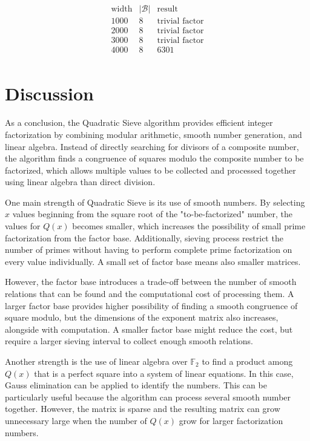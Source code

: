 \documentclass[11pt,a4paper]{article}
\begin{document}
\[
\begin{array}{c|c|c}
\text{width} & |\mathcal{B}| & \text{result} \\ \hline
1000 & 8 & \text{trivial factor} \\
2000 & 8 & \text{trivial factor} \\
3000 & 8 & \text{trivial factor} \\
4000 & 8 & 6301 \\
\end{array}
\]

\section*{Discussion}

As a conclusion, the Quadratic Sieve algorithm provides efficient integer factorization by combining modular arithmetic, smooth number generation, and linear algebra. Instead of directly searching for divisors of a composite number, the algorithm finds a congruence of squares modulo the composite number to be factorized, which allows multiple values to be collected and processed together using linear algebra than direct division.

One main strength of Quadratic Sieve is its use of smooth numbers. By selecting $x$ values beginning from the square root of the "to-be-factorized" number, the values for $Q(x)$ becomes smaller, which increases the possibility of small prime factorization from the factor base. Additionally, sieving process restrict the number of primes without having to perform complete prime factorization on every value individually. A small set of factor base means also smaller matrices.

However, the factor base introduces a trade-off between the number of smooth relations that can be found and the computational cost of processing them. A larger factor base provides higher possibility of finding a smooth congruence of square modulo, but the dimensions of the exponent matrix also increases, alongside with computation. A smaller factor base might reduce the cost, but require a larger sieving interval to collect enough smooth relations.

Another strength is the use of linear algebra over $\mathbb{F}_2$ to find a product among $Q(x)$ that is a perfect square into a system of linear equations. In this case, Gauss elimination can be applied to identify the numbers. This can be particularly useful because the algorithm can process several smooth number together. However, the matrix is sparse and the resulting matrix can grow unnecessary large when the number of $Q(x)$ grow for larger factorization numbers.
\end{document}

